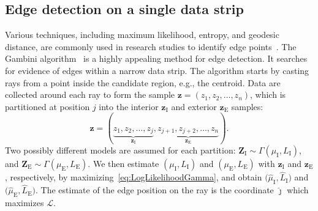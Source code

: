 \documentclass{article}
\begin{document}
\subsection{Edge detection on a single data strip}\vspace{-0.1cm}
Various techniques, including maximum likelihood, entropy, and geodesic distance, are commonly used in research studies to identify edge points~\cite{NaranjoTorres2017,Nascimento2019}. 
The Gambini algorithm~\cite{Gambini2007} is a highly appealing method for edge detection. 
It searches for evidence of edges within a narrow data strip. 
The algorithm starts by casting rays from a point inside the candidate region, e.g., the centroid.
Data are collected around each ray to form the sample $\bm z = (z_1,z_2,\dots,z_n)$, which is partitioned at position $j$ into the interior $\bm z_\text{I}$ and exterior $\bm z_\text{E}$ samples:
\vspace{-0.2cm}
$$
\bm z = (\underbrace{z_1,z_2,\dots,z_j}_{\bm z_\text{I}}, 
\underbrace{z_{j+1}, z_{j+2},\dots,z_n}_{\bm z_\text{E}}).
$$
Two possibly different models are assumed for each partition:
$\bm Z_\text{I} \sim \Gamma(\mu_\text{I},L_\text{I})$, and 
$\bm Z_\text{E} \sim \Gamma(\mu_\text{E},L_\text{E})$.
We then estimate $(\mu_\text{I},L_\text{I})$ and $(\mu_\text{E},L_\text{E})$ with $\bm z_\text{I}$ and $\bm z_\text{E}$, respectively, by maximizing~\eqref{eq:LogLikelihoodGamma}, and obtain $\big(\widehat{\mu}_\text{I}, \widehat{L}_\text{I}\big)$ and $\big(\widehat{\mu}_\text{E}, \widehat{L}_\text{E}\big)$.
The estimate of the edge position on the ray is the coordinate  $\widehat\jmath$ which maximizes $\mathcal L$.
\vspace{-0.2cm}
\end{document}
